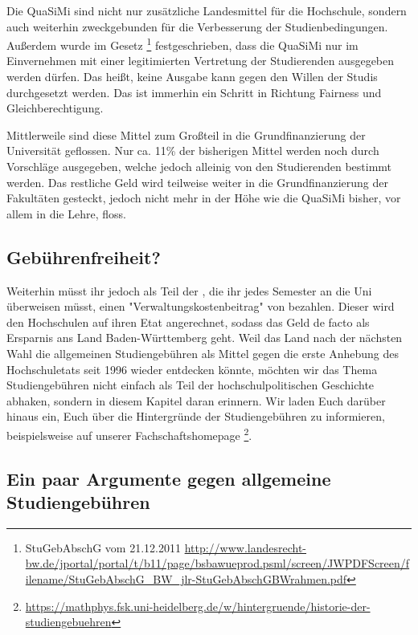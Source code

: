 Die QuaSiMi sind nicht nur zusätzliche Landesmittel für die Hochschule, sondern auch weiterhin zweckgebunden für die Verbesserung der Studienbedingungen. Außerdem wurde im Gesetz \footnote{StuGebAbschG vom 21.12.2011 \url{http://www.landesrecht-bw.de/jportal/portal/t/b11/page/bsbawueprod.psml/screen/JWPDFScreen/filename/StuGebAbschG\_BW\_jlr-StuGebAbschGBWrahmen.pdf}} festgeschrieben, dass die QuaSiMi nur im Einvernehmen mit einer legitimierten Vertretung der Studierenden ausgegeben werden dürfen. Das heißt, keine Ausgabe kann gegen den Willen der Studis durchgesetzt werden. Das ist immerhin ein Schritt in Richtung Fairness und Gleichberechtigung.

Mittlerweile sind diese Mittel zum Großteil in die Grundfinanzierung der Universität geflossen. Nur ca. 11\% der bisherigen Mittel werden noch durch Vorschläge ausgegeben, welche jedoch alleinig von den Studierenden bestimmt werden. Das restliche Geld wird teilweise weiter in die Grundfinanzierung der Fakultäten gesteckt, jedoch nicht mehr in der Höhe wie die QuaSiMi bisher, vor allem in die Lehre, floss.

\subsection*{Gebührenfreiheit?}
Weiterhin müsst ihr jedoch als Teil der \EUR{\beitragssumme}, die ihr jedes Semester an die Uni überweisen müsst, einen "Verwaltungskostenbeitrag" von \EUR{\verwaltungsbetrag} bezahlen. Dieser wird den Hochschulen auf ihren Etat angerechnet, sodass das Geld de facto als Ersparnis ans Land Baden-Württemberg geht. Weil das Land nach der nächsten Wahl die allgemeinen Studiengebühren als Mittel gegen die erste Anhebung des Hochschuletats seit 1996 wieder entdecken könnte, möchten wir das Thema Studiengebühren nicht einfach als Teil der hochschulpolitischen Geschichte abhaken, sondern in diesem Kapitel daran erinnern. Wir laden Euch darüber hinaus ein, Euch über die Hintergründe der Studiengebühren zu informieren, beispielsweise auf unserer Fachschaftshomepage \footnote{\url{https://mathphys.fsk.uni-heidelberg.de/w/hintergruende/historie-der-studiengebuehren}}.

\subsection*{Ein paar Argumente gegen allgemeine Studiengebühren}

